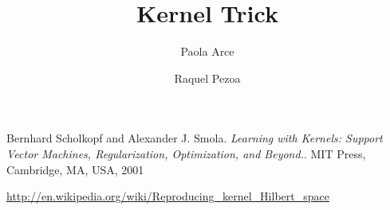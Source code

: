 \documentclass[12pt,reqno]{amsart}
\title{Kernel Trick}
\author{Paola Arce \and Raquel Pezoa}
\begin{document}
\maketitle












\begin{thebibliography}{9}

Bernhard Scholkopf and Alexander J. Smola. 
\emph{Learning with Kernels: Support Vector Machines, 
Regularization, Optimization, and Beyond.}.
MIT Press, Cambridge, MA, USA, 2001

\url{http://en.wikipedia.org/wiki/Reproducing_kernel_Hilbert_space}

\end{thebibliography}
\end{document}
